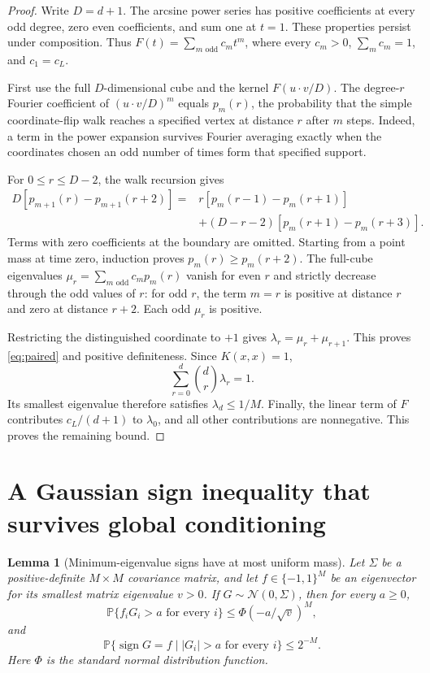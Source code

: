 \documentclass[11pt]{article}
\newtheorem{lemma}[theorem]{Lemma}
\theoremstyle{remark}
\DeclareMathOperator{\sign}{sign}
\newcommand{\Prb}{\mathbb P}
\begin{document}
\begin{proof}
Write $D=d+1$. The arcsine power series has positive coefficients
at every odd degree, zero even coefficients, and sum one at $t=1$.
These properties persist under composition. Thus
$F(t)=\sum_{m\text{ odd}}c_mt^m$, where every $c_m>0$,
$\sum_m c_m=1$, and $c_1=c_L$.

First use the full $D$-dimensional cube and the kernel
$F(u\cdot v/D)$. The degree-$r$ Fourier coefficient of
$(u\cdot v/D)^m$ equals $p_m(r)$, the probability that the simple
coordinate-flip walk reaches a specified vertex at distance $r$
after $m$ steps. Indeed, a term in the power expansion survives
Fourier averaging exactly when the coordinates chosen an odd
number of times form that specified support.

For $0\le r\le D-2$, the walk recursion gives
\begin{align*}
 D[p_{m+1}(r)-p_{m+1}(r+2)]
 ={}&r[p_m(r-1)-p_m(r+1)]\\
 &+(D-r-2)[p_m(r+1)-p_m(r+3)].
\end{align*}
Terms with zero coefficients at the boundary are omitted.
Starting from a point mass at time zero, induction proves
$p_m(r)\ge p_m(r+2)$. The full-cube eigenvalues
$\mu_r=\sum_{m\text{ odd}}c_mp_m(r)$ vanish for even $r$ and
strictly decrease through the odd values of $r$: for odd $r$,
the term $m=r$ is positive at distance $r$ and zero at distance
$r+2$. Each odd $\mu_r$ is positive.

Restricting the distinguished coordinate to $+1$ gives
$\lambda_r=\mu_r+\mu_{r+1}$. This proves
\eqref{eq:paired} and positive definiteness. Since $K(x,x)=1$,
\[
 \sum_{r=0}^d\binom dr\lambda_r=1.
\]
Its smallest eigenvalue therefore satisfies
$\lambda_d\le 1/M$. Finally, the linear term of $F$ contributes
$c_L/(d+1)$ to $\lambda_0$, and all other contributions are
nonnegative. This proves the remaining bound.
\end{proof}

\section{A Gaussian sign inequality that survives global conditioning}

\begin{lemma}[Minimum-eigenvalue signs have at most uniform mass]
\label{lem:gaussian-sign}
Let $\Sigma$ be a positive-definite $M\times M$ covariance matrix,
and let $f\in\{-1,1\}^M$ be an eigenvector for its smallest matrix
eigenvalue $v>0$. If $G\sim\mathcal N(0,\Sigma)$, then for every
$a\ge0$,
\begin{equation}\label{eq:raw-gaussian-bound}
 \Prb\{f_iG_i>a\text{ for every }i\}
 \le \Phi(-a/\sqrt v)^M,
\end{equation}
and
\begin{equation}\label{eq:conditioned-gaussian-bound}
 \Prb\{\sign G=f\mid |G_i|>a\text{ for every }i\}
 \le 2^{-M}.
\end{equation}
Here $\Phi$ is the standard normal distribution function.
\end{lemma}
\end{document}
